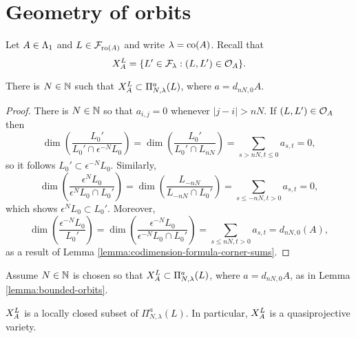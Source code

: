\documentclass[a4paper, 11pt]{report}
\begin{document}
\section{Geometry of orbits}

Let $A\in\matrices$ and $L\in\flags_{\ro{A}}$ and write $\lambda=\co{A}$. Recall that
\begin{equation*}
\xprod[L]{A} = \{L'\in\flags_\lambda: (L,L')\in\orbit{A}\}.
\end{equation*}

\begin{lemma}\label{lemma:bounded-orbits}
There is $N\in\naturals$ such that $\xprod[L]{A}\subset\Pi_{N,\lambda}^a(L)$, where $a=d_{nN,0}{A}$.
\end{lemma}

\begin{proof}
There is $N\in\naturals$ so that $a_{i,j}=0$ whenever $|j-i|>nN$. If $(L,L')\in\orbit{A}$ then
\begin{equation*}
\dim\left(\frac{L_0'}{L_0'\cap\epsilon^{-N}L_0}\right) = \dim\left(\frac{L_0'}{L_0'\cap L_{nN}}\right) = \sum_{s>nN,t\le 0} a_{s,t} = 0,
\end{equation*}
so it follows $L_0'\subset\epsilon^{-N}L_0$. Similarly,
\begin{equation*}
\dim\left(\frac{\epsilon^N L_0}{\epsilon^N L_0\cap L_0'}\right) = \dim\left(\frac{L_{-nN}}{L_{-nN}\cap L_0'}\right) = \sum_{s\le -nN,t>0} a_{s,t} = 0,
\end{equation*}
which shows $\epsilon^N L_0\subset L_0'$. Moreover,
\begin{equation*}
\dim\left(\frac{\epsilon^{-N}L_0}{L_0'}\right) = \dim\left(\frac{\epsilon^{-N}L_0}{\epsilon^{-N}L_0\cap L_0'}\right) = \sum_{s\le nN,t>0}a_{s,t} = d_{nN,0}(A),
\end{equation*}
as a result of Lemma \ref{lemma:codimension-formula-corner-sums}. 
\end{proof}

Assume $N\in\naturals$ is chosen so that $\xprod[L]{A}\subset\Pi_{N,\lambda}^a(L)$, where $a=d_{nN,0}{A}$, as in Lemma \ref{lemma:bounded-orbits}.

\begin{lemma}\label{lemma:orbits-are-quasiprojective}
$\xprod[L]{A}$ is a locally closed subset of $\Pi_{N,\lambda}^a(L)$. In particular, $\xprod[L]{A}$ is a quasiprojective variety.
\end{lemma}
\end{document}
